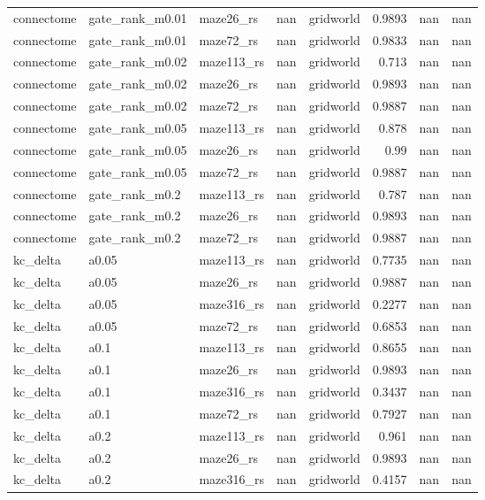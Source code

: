 \begin{table}[t]
\begin{tabular}{lllrrrrr}
connectome & gate\_rank\_m0.01 & maze26\_rs & nan & gridworld & 0.9893 & nan & nan \\
connectome & gate\_rank\_m0.01 & maze72\_rs & nan & gridworld & 0.9833 & nan & nan \\
connectome & gate\_rank\_m0.02 & maze113\_rs & nan & gridworld & 0.713 & nan & nan \\
connectome & gate\_rank\_m0.02 & maze26\_rs & nan & gridworld & 0.9893 & nan & nan \\
connectome & gate\_rank\_m0.02 & maze72\_rs & nan & gridworld & 0.9887 & nan & nan \\
connectome & gate\_rank\_m0.05 & maze113\_rs & nan & gridworld & 0.878 & nan & nan \\
connectome & gate\_rank\_m0.05 & maze26\_rs & nan & gridworld & 0.99 & nan & nan \\
connectome & gate\_rank\_m0.05 & maze72\_rs & nan & gridworld & 0.9887 & nan & nan \\
connectome & gate\_rank\_m0.2 & maze113\_rs & nan & gridworld & 0.787 & nan & nan \\
connectome & gate\_rank\_m0.2 & maze26\_rs & nan & gridworld & 0.9893 & nan & nan \\
connectome & gate\_rank\_m0.2 & maze72\_rs & nan & gridworld & 0.9887 & nan & nan \\
kc\_delta & a0.05 & maze113\_rs & nan & gridworld & 0.7735 & nan & nan \\
kc\_delta & a0.05 & maze26\_rs & nan & gridworld & 0.9887 & nan & nan \\
kc\_delta & a0.05 & maze316\_rs & nan & gridworld & 0.2277 & nan & nan \\
kc\_delta & a0.05 & maze72\_rs & nan & gridworld & 0.6853 & nan & nan \\
kc\_delta & a0.1 & maze113\_rs & nan & gridworld & 0.8655 & nan & nan \\
kc\_delta & a0.1 & maze26\_rs & nan & gridworld & 0.9893 & nan & nan \\
kc\_delta & a0.1 & maze316\_rs & nan & gridworld & 0.3437 & nan & nan \\
kc\_delta & a0.1 & maze72\_rs & nan & gridworld & 0.7927 & nan & nan \\
kc\_delta & a0.2 & maze113\_rs & nan & gridworld & 0.961 & nan & nan \\
kc\_delta & a0.2 & maze26\_rs & nan & gridworld & 0.9893 & nan & nan \\
kc\_delta & a0.2 & maze316\_rs & nan & gridworld & 0.4157 & nan & nan \\

\end{tabular}
\end{table}
